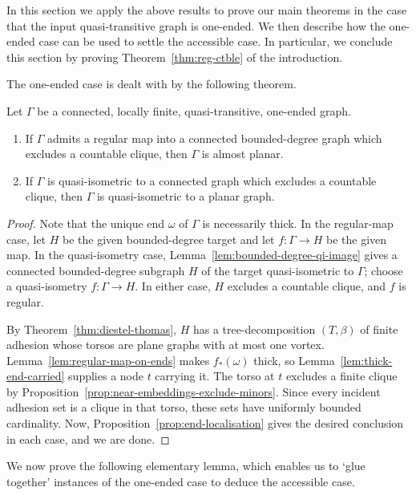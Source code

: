 \documentclass[a4paper]{amsart}
\begin{document}
In this section we apply the above results to prove our main theorems in the case that the input quasi-transitive graph is one-ended. We then describe how the one-ended case can be used to settle the accessible case. In particular, we conclude this section by proving Theorem~\ref{thm:reg-ctble} of the introduction. 

The one-ended case is dealt with by the following theorem. 

\begin{theorem}\label{thm:one-ended-rigidity}
Let $\Gamma$ be a connected, locally finite, quasi-transitive, one-ended graph.
\begin{enumerate}
\item If $\Gamma$ admits a regular map into a connected bounded-degree graph which excludes a countable clique, then $\Gamma$ is almost planar.
\item If $\Gamma$ is quasi-isometric to a connected graph which excludes a countable clique, then $\Gamma$ is quasi-isometric to a planar graph.
\end{enumerate}
\end{theorem}

\begin{proof}
Note that the unique end $\omega$ of $\Gamma$ is necessarily thick. 
In the regular-map case, let $H$ be the given bounded-degree target and let $f:\Gamma\to H$ be the given map.
In the quasi-isometry case, Lemma~\ref{lem:bounded-degree-qi-image} gives a connected bounded-degree subgraph $H$ of the target quasi-isometric to $\Gamma$; choose a quasi-isometry $f:\Gamma\to H$.
In either case, $H$ excludes a countable clique, and $f$ is regular.

By Theorem~\ref{thm:diestel-thomas}, $H$ has a tree-decomposition $(T,\beta)$ of finite adhesion whose torsos are plane graphs with at most one vortex.
Lemma~\ref{lem:regular-map-on-ends} makes $f_*(\omega)$ thick, so Lemma~\ref{lem:thick-end-carried} supplies a node $t$ carrying it.
The torso at $t$ excludes a finite clique by Proposition~\ref{prop:near-embeddings-exclude-minors}.
Since every incident adhesion set is a clique in that torso, these sets have uniformly bounded cardinality.
Now, Proposition~\ref{prop:end-localisation} gives the desired conclusion in each case, and we are done.
\end{proof}

We now prove the following elementary lemma, which enables us to `glue together' instances of the one-ended case to deduce the accessible case. 
\end{document}
